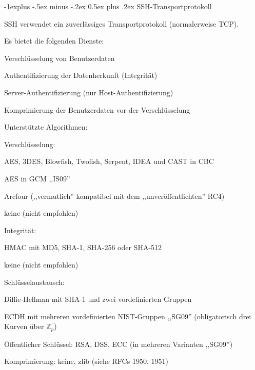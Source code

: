\documentclass[a4paper]{article}
\makeatletter
\renewcommand{\subsection}{\@startsection{subsection}{2}{0mm}%
 {-1explus -.5ex minus -.2ex}%
 {0.5ex plus .2ex}%
 {\normalfont\normalsize\bfseries}}
\makeatother
\begin{document}
\begin{multicols}{3}
\begin{itemize*}
            \subsection{SSH-Transportprotokoll}
            \begin{itemize*}
                  \item SSH verwendet ein zuverlässiges Transportprotokoll (normalerweise
                  TCP).
                  \item Es bietet die folgenden Dienste:
                  \begin{itemize*}
                        \item Verschlüsselung von Benutzerdaten
                        \item Authentifizierung der Datenherkunft (Integrität)
                        \item Server-Authentifizierung (nur Host-Authentifizierung)
                        \item Komprimierung der Benutzerdaten vor der Verschlüsselung
                  \end{itemize*}
                  \item Unterstützte Algorithmen:
                  \begin{itemize*}
                        \item Verschlüsselung:
                        \begin{itemize*} \item AES, 3DES, Blowfish, Twofish, Serpent, IDEA und CAST in CBC \item AES in GCM ,,IS09'' \item Arcfour (,,vermutlich'' kompatibel mit dem ,,unveröffentlichten'' RC4) \item keine (nicht empfohlen) \end{itemize*}
                        \item Integrität:
                        \begin{itemize*} \item HMAC mit MD5, SHA-1, SHA-256 oder SHA-512 \item keine (nicht empfohlen) \end{itemize*}
                        \item Schlüsselaustausch:
                        \begin{itemize*} \item Diffie-Hellman mit SHA-1 und zwei vordefinierten Gruppen \item ECDH mit mehreren vordefinierten NIST-Gruppen ,,SG09'' (obligatorisch drei Kurven über $\mathbb{Z}_p$) \item Öffentlicher Schlüssel: RSA, DSS, ECC (in mehreren Varianten ,,SG09'') \end{itemize*}
                        \item Komprimierung: keine, zlib (siehe RFCs 1950, 1951)
                  \end{itemize*}
            \end{itemize*}


\end{itemize*}
\end{multicols}
\end{document}

